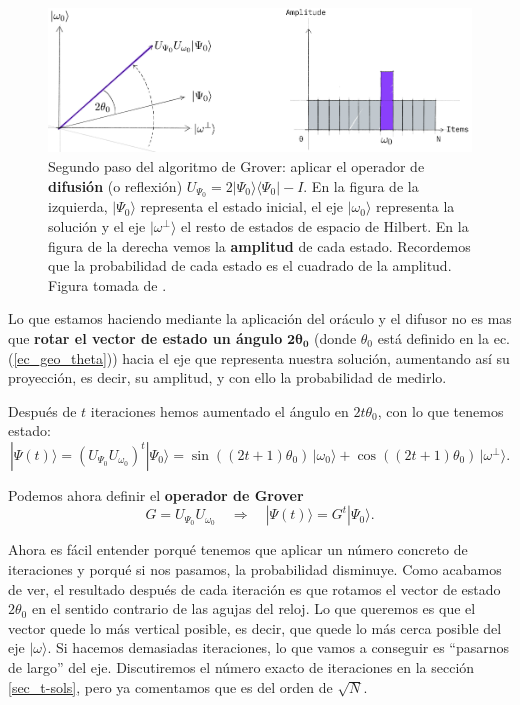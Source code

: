 \documentclass[a4paper,11pt]{article} %
\numberwithin{equation}{section}
\def\lp{\left(}
\def\rp{\right)}
\def\rqa{\quad \Rightarrow \quad}
\begin{document}
	\begin{figure}[t]
	\centering 
	\includegraphics[width=0.85\linewidth]{Figuras/Fig_geo_3.png}
	\caption{Segundo paso del algoritmo de Grover: aplicar el operador de \textbf{difusión} 
	(o reflexión) $U_{\Psi_0} = 2 |\Psi_0 \rangle \langle \Psi_0 | - I$.  En la figura de la izquierda, 
	$| \Psi_0 \rangle$ representa el estado inicial, el eje $|\omega_0 \rangle $ representa 
	la solución y el eje $| \omega^{\perp} \rangle$ el resto de estados de espacio de Hilbert. En la figura de la 
	derecha vemos la \textbf{amplitud} de cada estado. Recordemos que la probabilidad de cada estado 
	es el cuadrado de la amplitud. Figura tomada de \cite{Qiskit-Grover}.}
	\label{Fig_geo_3}
	\end{figure}


Lo que estamos haciendo mediante la aplicación del oráculo y el difusor no es mas que \textbf{rotar el vector de estado un ángulo} $\bm{2 \theta_0}$ (donde $\theta_0$ está definido en la ec. (\ref{ec_geo_theta})) hacia el eje que representa nuestra solución, aumentando así su proyección, es decir, su amplitud, y con ello la probabilidad de medirlo. 

Después de $t$ iteraciones hemos aumentado el ángulo en $2t\theta_0$, con lo que tenemos estado:
\begin{equation} \label{ec_geo_phi-j}
\boxed{|\Psi(t) \rangle = \lp U_{\Psi_0} U_{\omega_0} \rp^t | \Psi_0 \rangle} = \sin \lp (2t+1) \theta_0 \rp \, |\omega_0 \rangle + \cos \lp (2t+1) \theta_0 \rp \, | \omega^{\perp} \rangle.
\end{equation}

Podemos ahora definir el \textbf{operador de Grover}
\begin{equation}
\boxed{G = U_{\Psi_0} U_{\omega_0}} \rqa |\Psi(t) \rangle =  G^t | \Psi_0 \rangle.
\end{equation}


Ahora es fácil entender porqué tenemos que aplicar un número concreto de iteraciones y porqué si nos pasamos, la probabilidad disminuye. Como acabamos de ver, el resultado después de cada iteración es que rotamos el vector de estado $2 \theta_0$ en el sentido contrario de las agujas del reloj. Lo que queremos es que el vector quede lo más vertical posible, es decir, que quede lo más cerca posible del eje $|\omega\rangle $. Si hacemos demasiadas iteraciones, lo que vamos a conseguir es ``pasarnos de largo'' del eje. Discutiremos el número exacto de iteraciones en la sección \ref{sec_t-sols}, pero ya comentamos que es del orden de $\sqrt{N}$.
\end{document}
